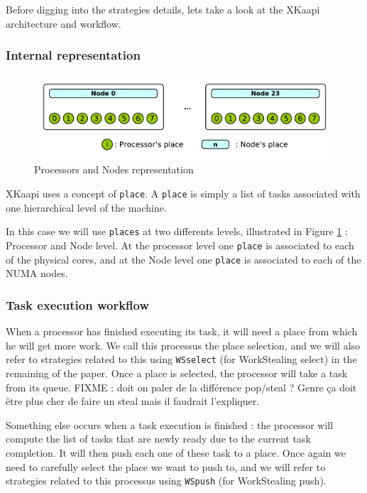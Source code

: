 \documentclass{Styles/llncs}
\begin{document}
Before digging into the strategies details, lets take a look at the XKaapi
architecture and workflow.

\subsubsection{Internal representation}

\begin{figure}[t]
  \centering
  \includegraphics[scale=0.8]{./figures/topology.pdf}
\caption{Processors and Nodes representation}
\label{fig:detail-topology}
\end{figure}

XKaapi uses a concept of \verb/place/.
A \verb/place/ is simply a list of tasks associated with one hierarchical level
of the machine.

In this case we will use \verb/places/ at two differents levels, illustrated in
Figure \ref{fig:detail-topology} : Processor and Node level.
At the processor level one \verb/place/ is associated to each of the physical cores, and
at the Node level one \verb/place/ is associated to each of the NUMA nodes.


\subsubsection{Task execution workflow}

When a processor has finished executing its task, it will need a place
from which he will get more work. We call this processus the place selection,
and we will also refer to strategies related to this using \verb/WSselect/ (for WorkStealing select)
in the remaining of the paper.
Once a place is selected, the processor will take a task from its queue.
FIXME : doit on paler de la différence pop/steal ? Genre ça doit être plus cher de
faire un steal mais il faudrait l'expliquer.


Something else occurs when a task execution is finished : the processor will
compute the list of tasks that are newly ready due to the current task completion.
It will then push each one of these task to a place. Once again we need to
carefully select the place we want to push to, and we will refer to strategies
related to this processus using \verb/WSpush/ (for WorkStealing push).
\end{document}
